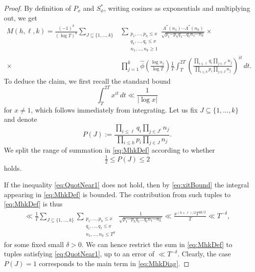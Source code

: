 \documentclass[12pt,oneside,english,a4paper]{amsart}
\theoremstyle{remark}
\numberwithin{equation}{section}
\newcommand{\Starphi}{S_\phi^*}
\begin{document}
\begin{proof}
    By definition of $P_x$ and $\Starphi$, writing cosines as exponentials and multiplying out, we get
    \begin{equation}\begin{split}\label{eq:MhkDef}
        M(h,\ell, k) = \frac{(-1)^k}{(\log T)^k} \sum_{J \subseteq \{1, \dots, k \}} &\sum_{\substack{p_1, \dots, p_h  \leq x\\
        q_1, \dots, q_\ell\leq x\\
        n_1, \dots, n_k \ge 1}} \frac{\Lambda^*(n_1) \cdots \Lambda^*(n_k)}{\sqrt{p_1\cdots p_h q_1\dots q_\ell n_1 \cdots n_k }} \times \\ \times &\prod_{j=1}^k \hat\phi\left(\frac{\log n_j}{\log T}\right) \frac{1}{T} \int_T^{2 T} \left( \frac{\prod_{i\leq \ell} q_i \prod_{j \in J^c} n_j}{\prod_{i\leq h} p_i \prod_{j \in J} n_j} \right)^{i t} \, dt.
    \end{split}\end{equation}
    To deduce the claim, we first recall the standard bound
    \begin{equation}\label{eq:xitBound}
        \int_T^{2T} x^{it} \, dt \ll \frac{1}{| \log x |}
    \end{equation} 
    for $x \ne 1$, which follows immediately from integrating.
    Let us fix $J\subseteq\{1, \dots, k\}$  and denote $$P(J):=\frac{\prod_{i\leq \ell} q_i \prod_{j \in J^c} n_j}{\prod_{i\leq h} p_i \prod_{j \in J} n_j}.$$ 
    We split the range of summation in \eqref{eq:MhkDef} according to whether
    \begin{equation}\label{eq:QuotNear1}
        \tfrac{1}{2} \le P(J)  \le 2
    \end{equation}
    holds. 
    
    If the inequality \eqref{eq:QuotNear1} does not hold, then by \eqref{eq:xitBound} the integral appearing in \eqref{eq:MhkDef} is bounded. The contribution from such tuples to \eqref{eq:MhkDef} is thus
    \begin{align*}
        \ll \frac{1}{T} \sum_{J \subseteq \{1, \dots, k \}} \sum_{\substack{p_1, \dots, p_h\leq x \\
        q_1, \dots, q_\ell\leq x\\
        n_1, \dots, n_k \le T^\eta
        }} \frac{1}{\sqrt{p_1\cdots p_h  q_1\dots q_\ell n_1 \cdots n_k}} 
        \ll \frac{x^{(h+\ell)/2}T^{\eta k/2}}{T}
        \ll T^{-\delta},
    \end{align*}
    for some fixed small $\delta>0$.
    We can hence restrict the sum in \eqref{eq:MhkDef} to tuples satisfying \eqref{eq:QuotNear1}, up to an error of $\ll T^{-\delta}$. Clearly, the case $P(J)=1$
    corresponds to the main term in \eqref{eq:MhkDiag}. 
    

\end{proof}
\end{document}
